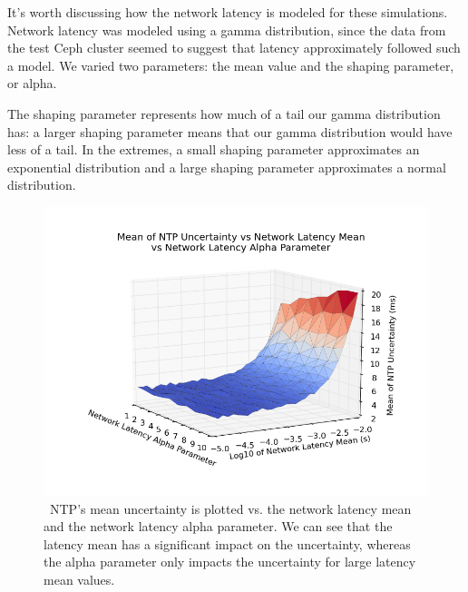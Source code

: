 It's worth discussing how the network latency is modeled for these
simulations. Network latency was modeled using a gamma distribution,
since the data from the test Ceph cluster seemed to suggest that
latency approximately followed such a model. We varied two parameters:
the mean value and the shaping parameter, or alpha.

The shaping parameter represents how much of a tail our gamma
distribution has: a larger shaping parameter means that our gamma
distribution would have less of a tail. In the extremes, a small
shaping parameter approximates an exponential distribution and a large
shaping parameter approximates a normal distribution.


\begin{figure}[h]
  \caption{~NTP's mean uncertainty is plotted vs. the network latency mean and the network latency alpha parameter. We can see that the latency mean has a significant impact on the uncertainty, whereas the alpha parameter only impacts the uncertainty for large latency mean values.}
  \label{fig:mean-uncertainty_latency-mean_latency-alpha}
  \includegraphics[width=0.8\linewidth]{mean_max_error-mean_latency-latency_alpha.png}
\end{figure}



